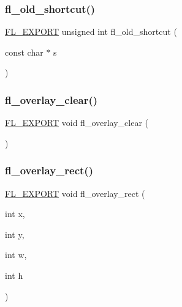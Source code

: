 \subsubsection{\texorpdfstring{fl\+\_\+old\+\_\+shortcut()}{fl\_old\_shortcut()}}
{\footnotesize\ttfamily \hyperlink{_fl___export_8_h_aa9ba29a18aee9d738370a06eeb4470fc}{F\+L\+\_\+\+E\+X\+P\+O\+RT} unsigned int fl\+\_\+old\+\_\+shortcut (\begin{DoxyParamCaption}\item[{const char $\ast$}]{s }\end{DoxyParamCaption})}

\mbox{\label{group__fl__drawings_ga9d2c84bf8448312d165c286458e4984d}} 
\subsubsection{\texorpdfstring{fl\+\_\+overlay\+\_\+clear()}{fl\_overlay\_clear()}}
{\footnotesize\ttfamily \hyperlink{_fl___export_8_h_aa9ba29a18aee9d738370a06eeb4470fc}{F\+L\+\_\+\+E\+X\+P\+O\+RT} void fl\+\_\+overlay\+\_\+clear (\begin{DoxyParamCaption}{ }\end{DoxyParamCaption})}

\mbox{\label{group__fl__drawings_gab0856445ac32f9b4606bca24cce63c7e}} 
\subsubsection{\texorpdfstring{fl\+\_\+overlay\+\_\+rect()}{fl\_overlay\_rect()}}
{\footnotesize\ttfamily \hyperlink{_fl___export_8_h_aa9ba29a18aee9d738370a06eeb4470fc}{F\+L\+\_\+\+E\+X\+P\+O\+RT} void fl\+\_\+overlay\+\_\+rect (\begin{DoxyParamCaption}\item[{int}]{x,  }\item[{int}]{y,  }\item[{int}]{w,  }\item[{int}]{h }\end{DoxyParamCaption})}

